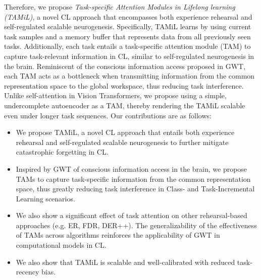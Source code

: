 \documentclass{article} %
\begin{document}
Therefore, we propose \textit{Task-specific Attention Modules in Lifelong learning (TAMiL)}, a novel CL approach that encompasses both experience rehearsal and self-regulated scalable neurogenesis. Specifically, TAMiL learns by using current task samples and a memory buffer that represents data from all previously seen tasks. Additionally, each task entails a task-specific attention module (TAM) to capture task-relevant information in CL, similar to self-regulated neurogenesis in the brain. Reminiscent of the conscious information access proposed in GWT, each TAM acts as a bottleneck when transmitting information from the common representation space to the global workspace, thus reducing task interference.  Unlike self-attention in Vision Transformers, we propose using a simple, undercomplete autoencoder as a TAM, thereby rendering the TAMiL scalable even under longer task sequences. 
Our contributions are as follows: 
\begin{itemize}
    \item We propose TAMiL, a novel CL approach that entails both experience rehearsal and self-regulated scalable neurogenesis to further mitigate catastrophic forgetting in CL. 
    \item Inspired by GWT of conscious information access in the brain, we propose TAMs to capture task-specific information from the common representation space, thus greatly reducing task interference in Class- and Task-Incremental Learning scenarios.
    \item We also show a significant effect of task attention on other rehearsal-based approaches  (e.g. ER, FDR, DER++). The generalizability of the effectiveness of TAMs across algorithms reinforces the applicability of GWT in computational models in CL. 
    \item  We also show that TAMiL is scalable and well-calibrated with reduced task-recency bias. 
\end{itemize}
\end{document}
